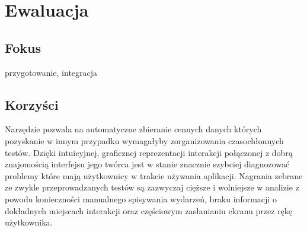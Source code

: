 \section{Ewaluacja}

\subsection{Fokus}
przygotowanie, integracja 

\subsection{Korzyści}
Narzędzie pozwala na automatyczne zbieranie cennych danych których pozyskanie w innym przypadku wymagałyby zorganizowania czasochłonnych testów. Dzięki intuicyjnej, graficznej reprezentacji interakcji połączonej z dobrą znajomością interfejsu jego twórca jest w stanie znacznie szybciej diagnozować problemy które mają użytkownicy w trakcie używania aplikacji. Nagrania zebrane ze zwykle przeprowadzanych testów są zazwyczaj cięższe i wolniejsze w analizie z powodu konieczności manualnego spisywania wydarzeń, braku informacji o dokładnych miejscach interakcji oraz częściowym zasłanianiu ekranu przez rękę użytkownika. 
